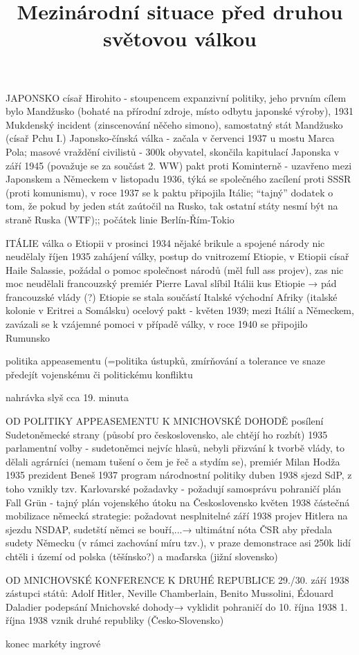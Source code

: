 \documentclass{article}
\title{\vspace{-2cm}Mezinárodní situace před druhou světovou válkou\vspace{-1.7cm}}
\date{}
\author{}
\begin{document}
\maketitle


JAPONSKO
císař Hirohito - stoupencem expanzivní politiky, jeho prvním cílem bylo Mandžusko (bohaté na přírodní zdroje, místo odbytu japonské výroby), 1931 Mukdenský incident (zinscenování něčeho simono), samostatný stát Mandžusko (císař Pchu I.)
Japonsko-čínská válka - začala v červenci 1937 u mostu Marca Pola; masové vraždění civilistů - 300k obyvatel, skončila kapitulací Japonska v září 1945 (považuje se za součást 2. WW)
pakt proti Kominterně - uzavřeno mezi Japonskem a Německem v listopadu 1936, týká se společného zacílení proti SSSR (proti komunismu), v roce 1937 se k paktu připojila Itálie; “tajný” dodatek o tom, že pokud by jeden stát zaútočil na Rusko, tak ostatní státy nesmí být na straně Ruska (WTF);; počátek linie Berlín-Řím-Tokio

ITÁLIE
válka o Etiopii v prosinci 1934 nějaké brikule a spojené národy nic neudělaly
říjen 1935 zahájení války, postup do vnitrozemí Etiopie, v Etiopii císař Haile Salassie, požádal o pomoc společnost národů (měl full ass projev), zas nic moc neudělali
francouzský premiér Pierre Laval slíbil Itálii kus Etiopie → pád francouzské vlády (?)
Etiopie se stala součástí Italské východní Afriky (italské kolonie v Eritrei a Somálsku)
ocelový pakt - květen 1939; mezi Itálií a Německem, zavázali se k vzájemné pomoci v případě války, v roce 1940 se připojilo Rumunsko

politika appeasementu (=politika ústupků, zmírňování a tolerance ve snaze předejít vojenskému či politickému konfliktu








nahrávka slyš cca 19. minuta

OD POLITIKY APPEASEMENTU K MNICHOVSKÉ DOHODĚ
posílení Sudetoněmecké strany (působí pro československo, ale chtějí ho rozbít)
1935 parlamentní volby - sudetoněmci nejvíc hlasů, nebyli přizvání k tvorbě vlády, to dělali agrárníci (nemam tušení o čem je řeč a stydím se), premiér Milan Hodža
1935 prezident Beneš
1937 program národnostní politiky
duben 1938 sjezd SdP, z toho vznikly tzv. Karlovarské požadavky - požadují samosprávu pohraničí
plán Fall Grün - tajný plán vojenského útoku na Československo
květen 1938 částečná mobilizace
německá strategie: požadovat nesplnitelné
září 1938 projev Hitlera na sjezdu NSDAP, sudetští němci se bouří,...→
ultimátní nóta ČSR aby předala sudety Německu (v rámci zachování míru tzv.), v praze demonstrace asi 250k lidí
chtěli i území od polska (těšínsko?) a maďarska (jižní slovensko)

OD MNICHOVSKÉ KONFERENCE K DRUHÉ REPUBLICE
29./30. září 1938
zástupci států: Adolf Hitler, Neville Chamberlain, Benito Mussolini, Édouard Daladier
podepsání Mnichovské dohody→ vyklidit pohraničí do 10. října 1938
1. října 1938 vznik druhé republiky (Česko-Slovensko)

konec markéty ingrové
\end{document}
